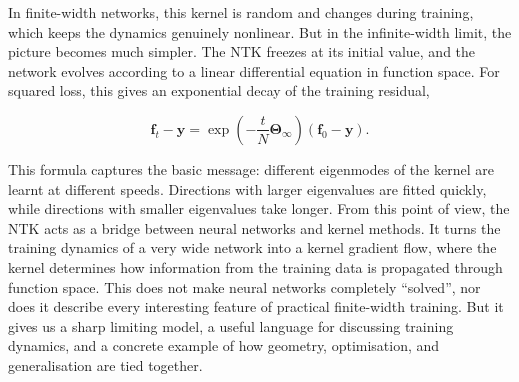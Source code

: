 In finite-width networks, this kernel is random and changes during training, which keeps the dynamics genuinely nonlinear. But in the infinite-width limit, the picture becomes much simpler. The NTK freezes at its initial value, and the network evolves according to a linear differential equation in function space. For squared loss, this gives an exponential decay of the training residual,

\[
\mathbf{f}_t-\mathbf{y}
=
\exp\!\left(
-
\frac{t}{N}
\boldsymbol{\Theta}_\infty
\right)
\left(
\mathbf{f}_0-\mathbf{y}
\right).
\]

This formula captures the basic message: different eigenmodes of the kernel are learnt at different speeds. Directions with larger eigenvalues are fitted quickly, while directions with smaller eigenvalues take longer. From this point of view, the NTK acts as a bridge between neural networks and kernel methods. It turns the training dynamics of a very wide network into a kernel gradient flow, where the kernel determines how information from the training data is propagated through function space. This does not make neural networks completely ``solved'', nor does it describe every interesting feature of practical finite-width training. But it gives us a sharp limiting model, a useful language for discussing training dynamics, and a concrete example of how geometry, optimisation, and generalisation are tied together.
